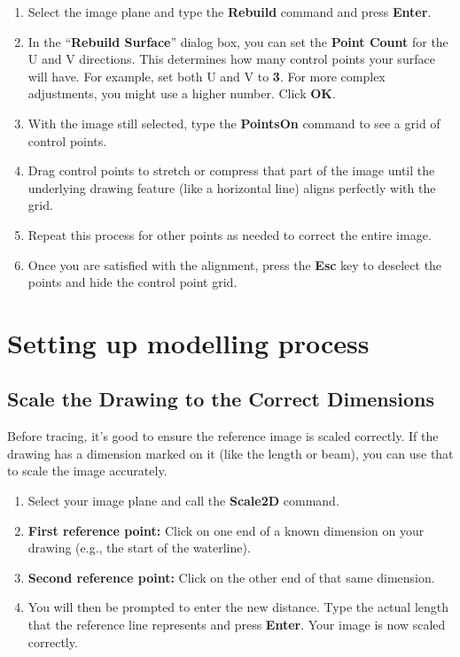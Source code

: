 \documentclass{article}
\begin{document}
\begin{enumerate}
\item Select the image plane and type the \textbf{Rebuild} command and press \textbf{Enter}.
\item In the ``\textbf{Rebuild Surface}'' dialog box, you can set the \textbf{Point Count} for the U and V directions. This determines how many control points your surface will have. For example, set both U and V to \textbf{3}. For more complex adjustments, you might use a higher number. Click \textbf{OK}.
\item With the image still selected, type the \textbf{PointsOn} command to see a grid of control points.
\item Drag control points to stretch or compress that part of the image until the underlying drawing feature (like a horizontal line) aligns perfectly with the grid.
\item Repeat this process for other points as needed to correct the entire image.
\item Once you are satisfied with the alignment, press the \textbf{Esc} key to deselect the points and hide the control point grid.
\end{enumerate}

\section{Setting up modelling process}

\subsection{Scale the Drawing to the Correct Dimensions}

Before tracing, it's good to ensure the reference image is scaled correctly. If the drawing has a dimension marked on it (like the length or beam), you can use that to scale the image accurately.

\begin{enumerate}
\item Select your image plane and call the \textbf{Scale2D} command.
\item \textbf{First reference point:} Click on one end of a known dimension on your drawing (e.g., the start of the waterline).
\item \textbf{Second reference point:} Click on the other end of that same dimension.
\item You will then be prompted to enter the new distance. Type the actual length that the reference line represents and press \textbf{Enter}. Your image is now scaled correctly.
\end{enumerate}
\end{document}
